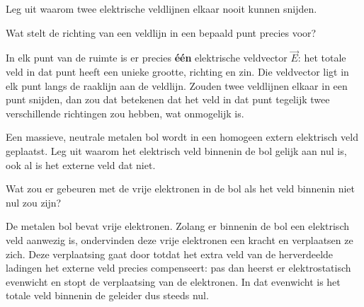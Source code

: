 \documentclass{ximera}
\begin{document}
\begin{question}
    Leg uit waarom twee elektrische veldlijnen elkaar nooit kunnen snijden.

    \begin{hint}
        Wat stelt de richting van een veldlijn in een bepaald punt precies voor?
    \end{hint}

    \begin{solution}\nl
        In elk punt van de ruimte is er precies \textbf{één} elektrische veldvector $\vec{E}$: het totale veld in dat punt heeft een unieke grootte, richting en zin. Die veldvector ligt in elk punt langs de raaklijn aan de veldlijn. Zouden twee veldlijnen elkaar in een punt snijden, dan zou dat betekenen dat het veld in dat punt tegelijk twee verschillende richtingen zou hebben, wat onmogelijk is.
    \end{solution}
\end{question}

\begin{question}
    Een massieve, neutrale metalen bol wordt in een homogeen extern elektrisch veld geplaatst. Leg uit waarom het elektrisch veld binnenin de bol gelijk aan nul is, ook al is het externe veld dat niet.

    \begin{hint}
        Wat zou er gebeuren met de vrije elektronen in de bol als het veld binnenin niet nul zou zijn?
    \end{hint}

    \begin{solution}\nl
        De metalen bol bevat vrije elektronen. Zolang er binnenin de bol een elektrisch veld aanwezig is, ondervinden deze vrije elektronen een kracht en verplaatsen ze zich. Deze verplaatsing gaat door totdat het extra veld van de herverdeelde ladingen het externe veld precies compenseert: pas dan heerst er elektrostatisch evenwicht en stopt de verplaatsing van de elektronen. In dat evenwicht is het totale veld binnenin de geleider dus steeds nul.
    \end{solution}
\end{question}
\end{document}
